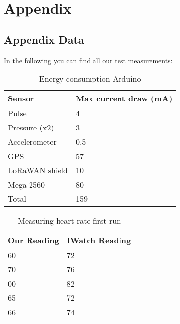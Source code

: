 \chapter{Appendix}


\section{Appendix Data}
In the following you can find all our test measurements:
\begin{table}[h!]
	\centering
	\begin{tabular}{@{}ll@{}}
		\toprule
		\textbf{Sensor}& \textbf{Max current draw (mA)} \\ \midrule
		Pulse          & 4                     \\
		Pressure (x2)  & 3                     \\
		Accelerometer  & 0.5                   \\
		GPS            & 57                    \\
		LoRaWAN shield & 10                    \\
		Mega 2560      & 80                    \\
		Total          & 159                   \\ \bottomrule
	\end{tabular}
	\caption[Energy consumption Arduino]{Energy consumption Arduino}
	\label{tab:EnergyConsumption}
\end{table}

\begin{table}[h!]
	\centering
	\begin{tabular}{@{}ll@{}}
		\toprule
		\textbf{Our Reading} & \textbf{IWatch Reading }\\ \midrule
		60          & 72             \\
		70          & 76             \\
		00          & 82             \\
		65          & 72             \\
		66          & 74             \\ \bottomrule
	\end{tabular}
	\caption[Measuring heart rate first run]{Measuring heart rate first run}
	\label{tab:HeartRateFirst}
\end{table}

